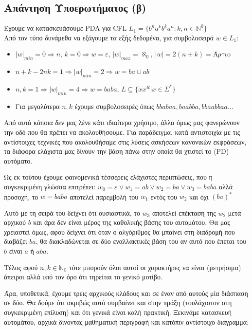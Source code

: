 \subsection{Απάντηση Υποερωτήματος (β)}
\label{ssec:Solution_2.2}
\doublespacing
Έχουμε να κατασκευάσουμε PDA για CFL $L_1 = \{b^n a^k b^k a^n : k, n \in  \mathbb{N}^0 \}$\\
Από τον τύπο δυνάμεθα να εξάγουμε τα εξής δεδομένα, για συμβολοσειρά $w \in L_1$:

\begin{itemize}
	\itemsep0em
	\item $\vert w \vert_{min} = 0 \Longrightarrow n,\,k = 0 \Longrightarrow w = ε$, \quad $\vert w \vert_{max} =
	\aleph_0$, \quad $|w| = 2(n+k) = \text{Άρτιο}$
	\item $ n + k - 2nk = 1  \Longrightarrow |w|_{min} = 2 \Longrightarrow w = ba \cup ab$
	\item $ n, k = 1 \Longrightarrow \vert w \vert_{min} = 4 \Longrightarrow w = baba$, \qquad $L \subseteq \{xx^R
	\vert x \in \Sigma^* \}$
	\item Για μεγαλύτερα $n, k$ έχουμε συμβολοσειρές όπως $bbabaa, baabba, bbaabbaa...$
\end{itemize}

\par
Από αυτά κάποια δεν μας λένε κάτι ιδιαίτερα χρήσιμο, άλλα όμως μας φανερώνουν την οδό που θα πρέπει να
ακολουθήσουμε. Για παράδειγμα, κατά αντιστοιχία με τις αντίστοιχες τεχνικές που ακολουθήσαμε στις
λύσεις ασκήσεων κανονικών εκφράσεων, τα διάφορα ελάχιστα μας δίνουν την βάση πάνω στην οποία θα χτιστεί το (PD)
αυτόματο.
\par
Ως εκ τούτου έχουμε φαινομενικά τέσσερεις ελάχιστες περιπτώσεις, που η
συγκεκριμένη γλώσσα επιτρέπει:
$w_0 = ε \lor w_1 = ab \lor w_2 = ba \lor w_3 = baba$ αλλά προσοχή, το $w = baba$
αποτελεί παρεμβολή του $w_1$ εντός του $w_2$ και όχι $(ba)^*$
\par
Αυτό με τη σειρά του δείχνει ότι ουσιαστικά, το $w_3$ αποτελεί επέκταση της $w_2$ μετά αρχικού $b$ και άρα δεν
είναι μέρος της καθολικής βάσης του αυτομάτου. Θα μας χρειαστεί όμως, αφού δείχνει ότι όταν ο
αλγόριθμος θα μπαίνει στη διαδρομή που διαβάζει $ba$, θα διακλαδώνεται σε δύο εναλλακτικές βάση του
αν αυτό που έπεται του $b$ είναι $a$ ή $aba$.
\vfill
\clearpage
\par Τέλος αφού $n, k \in \mathbb{N_0}$ τότε μπορούν όλοι αυτοί οι χαρακτήρες να είναι (μετρήσιμα) άπειροι αλλά υπό
τον όρο ότι τηρείται το γενικό μοτίβο.
\par Άρα, υποθετικά, έχουμε τρεις αρχικούς κλάδους και σε έναν από αυτούς μία διάσπαση σε δύο. Θα δούμε ότι ακριβώς
αυτό συμβαίνει και στην πράξη (τουλάχιστον στη συγκεκριμένη επίλυση) και ότι γενικά είναι καλή
πρακτική. Ξεκινάμε κατασκευή αυτομάτου, αρχικά δίνοντας μαθηματική περιγραφή και κατόπιν αντίστοιχο
διάγραμμα:


